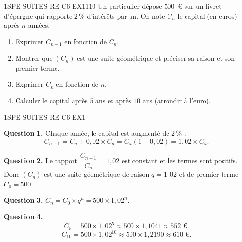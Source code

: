 
\begin{exercice}{1SPE-SUITES-RE-C6-EX1}{1}{10}
Un particulier dépose $500$~€ sur un livret d'épargne qui rapporte $2\,\%$ d'intérêts par an. On note $C_n$ le capital (en euros) après $n$ années.
\begin{enumerate}
  \item Exprimer $C_{n+1}$ en fonction de $C_n$.
  \item Montrer que $(C_n)$ est une suite géométrique et préciser sa raison et son premier terme.
  \item Exprimer $C_n$ en fonction de $n$.
  \item Calculer le capital après $5$ ans et après $10$ ans (arrondir à l'euro).
\end{enumerate}
\end{exercice}


\begin{corrige}{1SPE-SUITES-RE-C6-EX1}


\textbf{Question 1.} Chaque année, le capital est augmenté de $2\,\%$ :
\[
C_{n+1} = C_n + 0{,}02 \times C_n = C_n(1 + 0{,}02) = 1{,}02 \times C_n.
\]


\textbf{Question 2.} Le rapport $\dfrac{C_{n+1}}{C_n} = 1{,}02$ est constant et les termes sont positifs. Donc $(C_n)$ est une suite géométrique de raison $q = 1{,}02$ et de premier terme $C_0 = 500$.

\textbf{Question 3.} $C_n = C_0 \times q^n = 500 \times 1{,}02^n$.

\textbf{Question 4.}
\[
C_5 = 500 \times 1{,}02^5 \approx 500 \times 1{,}1041 \approx 552 \text{ €.}
\]
\[
C_{10} = 500 \times 1{,}02^{10} \approx 500 \times 1{,}2190 \approx 610 \text{ €.}
\]

\end{corrige}

